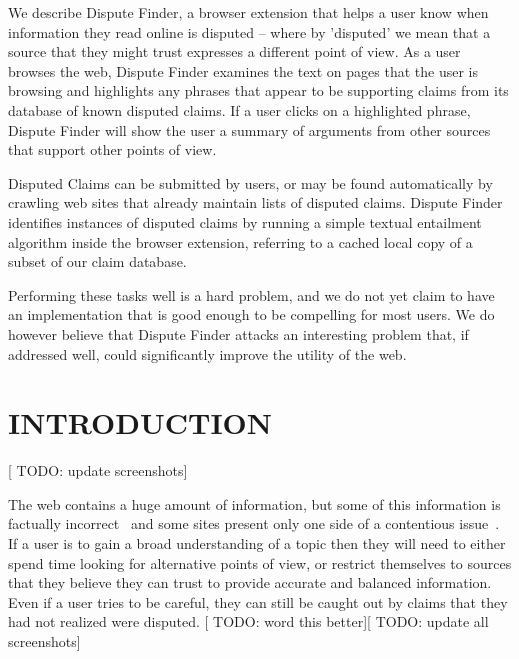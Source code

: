 \documentclass{www2010-submission}
\newcommand{\todo}[1]{{[\color{blue} TODO: #1]}}
\begin{document}
We describe Dispute Finder, a browser extension that helps a user know when information they read online is disputed -- where by 'disputed' we mean that a source that they might trust expresses a different point of view.  As a user browses the web, Dispute Finder examines the text on pages that the user is browsing and highlights any phrases that appear to be supporting claims from its database of known disputed claims. If a user clicks on a highlighted phrase, Dispute Finder will show the user a summary of arguments from other sources that support other points of view.

Disputed Claims can be submitted by users, or may be found automatically by crawling web sites that already maintain lists of disputed claims. Dispute Finder identifies instances of disputed claims by running a simple textual entailment algorithm inside the browser extension, referring to a cached local copy of a subset of our claim database.

Performing these tasks well is a hard problem, and we do not yet claim to have an implementation that is good enough to be compelling for most users. We do however believe that Dispute Finder attacks an interesting problem that, if addressed well, could significantly improve the utility of the web.







\section{INTRODUCTION}

\todo{update screenshots}

The web contains a huge amount of information, but some of this information is factually incorrect~\cite{Neumann2003,Resnik1998,Zhou2004} and some sites present only one side of a contentious issue~\cite{Herman2002}. 
If a user is to gain a broad understanding of a topic then they will need to either spend time looking for alternative points of view, or restrict themselves to sources that they believe they can trust to provide accurate and balanced information.
Even if a user tries to be careful, they can still be caught out by claims that they had not realized were disputed.
\todo{word this better}\todo{update all screenshots}
\end{document}
